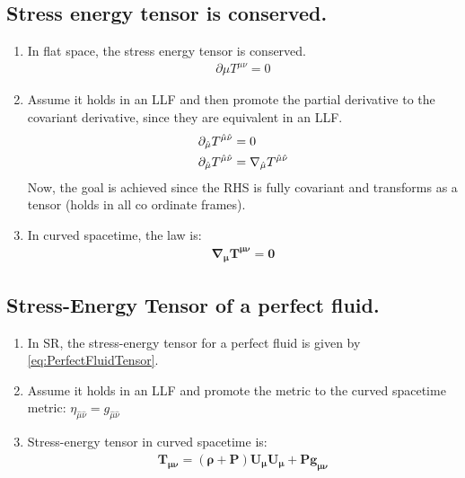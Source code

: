\documentclass[10pt]{article}
\begin{document}
            \subsection{Stress energy tensor is conserved.}
                \begin{enumerate}
                    \item In flat space, the stress energy tensor is conserved.
                        \begin{align}
                            \partial{\mu}T^{\mu\nu} = 0
                        \end{align}
                    \item Assume it holds in an LLF and then promote the partial derivative to the covariant derivative, since they are equivalent in an LLF.
                        \begin{align}
                            \partial_{\hat{\mu}}T^{\hat{\mu}\hat{\nu}} &= 0 \notag \\ \partial_{\hat{\mu}}T^{\hat{\mu}\hat{\nu}} &= \nabla_{\hat{\mu}}T^{\hat{\mu}\hat{\nu}}
                        \end{align}
                    Now, the goal is achieved since the RHS is fully covariant and transforms as a tensor (holds in all co ordinate frames). 
                    \item In curved spacetime, the law is:
                        \begin{align}
                            \boldsymbol{\nabla_{\mu}T^{\mu\nu} = 0}
                        \end{align}
                \end{enumerate}
            
            \subsection{Stress-Energy Tensor of a perfect fluid.}
                \begin{enumerate}
                    \item In SR, the stress-energy tensor for a perfect fluid is given by \eqref{eq:PerfectFluidTensor}.
                    \item Assume it holds in an LLF and promote the metric to the curved spacetime metric: $\eta_{\hat{\mu}\hat{\nu}} =      g_{\hat{\mu}\hat{\nu}}$
                    \item Stress-energy tensor in curved spacetime is:
                        \begin{align}
                            \boldsymbol{T_{\mu\nu} = (\rho+P)U_{\mu}U_{\mu} + Pg_{\mu\nu}}
                        \end{align}
                \end{enumerate}
            
\end{document}
